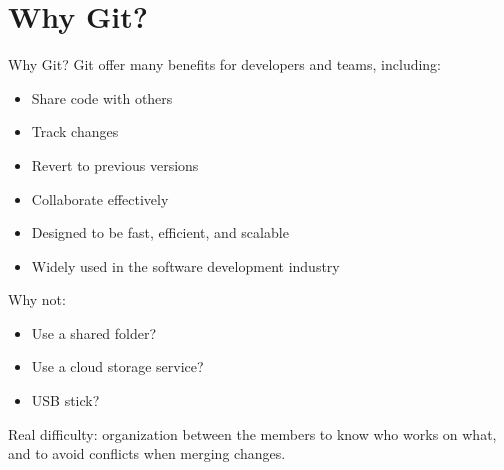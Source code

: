 \documentclass[show notes on second screen=right]{beamer}
\begin{document}
\section{Why Git?}
\begin{frame}[t]{Why Git?}
  \onslide<+->
  Git offer many benefits for developers and teams, including:
  \onslide<+->
  \begin{itemize}
    \item Share code with others
    \item Track changes
    \item Revert to previous versions
    \item Collaborate effectively
    \item Designed to be fast, efficient, and scalable
    \item Widely used in the software development industry 
  \end{itemize}
  \onslide<+->
  Why not:
  \begin{itemize}
    \item Use a shared folder?
    \item Use a cloud storage service?
    \item USB stick?
  \end{itemize}
  \onslide<+->
  Real difficulty: organization between the members to know who works on what, and to avoid conflicts when merging changes.\\
\end{frame}
\end{document}
